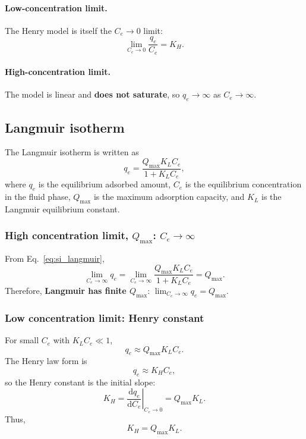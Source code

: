 \documentclass[journal=jacsat,manuscript=article]{achemso}
\begin{document}
\paragraph{Low-concentration limit.}
The Henry model is itself the $C_e \to 0$ limit:
\begin{equation}
	\lim_{C_e \to 0} \frac{q_e}{C_e} = K_H.
\end{equation}

\paragraph{High-concentration limit.}
The model is linear and \textbf{does not saturate}, so $q_e \to \infty$ as
$C_e \to \infty$.

\subsection{Langmuir isotherm}
\label{sec:si_langmuir}

The Langmuir isotherm is written as
\begin{equation}
	q_e = \frac{Q_{\max} K_L C_e}{1 + K_L C_e},
	\label{eq:si_langmuir}
\end{equation}
where \(q_e\) is the equilibrium adsorbed amount, \(C_e\) is the
equilibrium concentration in the fluid phase, \(Q_{\max}\) is the maximum
adsorption capacity, and \(K_L\) is the Langmuir equilibrium constant.

\subsubsection{High concentration limit, \(Q_{\max}\): \(C_e \to \infty\)}

From Eq.~\eqref{eq:si_langmuir},
\begin{equation}
	\lim_{C_e \to \infty} q_e
	= \lim_{C_e \to \infty}
	\frac{Q_{\max} K_L C_e}{1 + K_L C_e}
	= Q_{\max}.
\end{equation}
Therefore,
\textbf{Langmuir has finite $Q_{\max}$}:\quad
$\displaystyle \lim_{C_e \to \infty} q_e = Q_{\max}$.%

\subsubsection{Low concentration limit: Henry constant}

For small \(C_e\) with \(K_L C_e \ll 1\),
\begin{equation}
	q_e \approx Q_{\max} K_L C_e.
\end{equation}
The Henry law form is
\begin{equation}
	q_e \approx K_H C_e,
	\label{eq:si_henry}
\end{equation}
so the Henry constant is the initial slope:
\begin{equation}
	K_H = \left.\frac{\mathrm{d}q_e}{\mathrm{d}C_e}\right|_{C_e \to 0}
	= Q_{\max} K_L.
\end{equation}
Thus,
\begin{equation}
	\boxed{K_H = Q_{\max} K_L.}
\end{equation}
\end{document}
